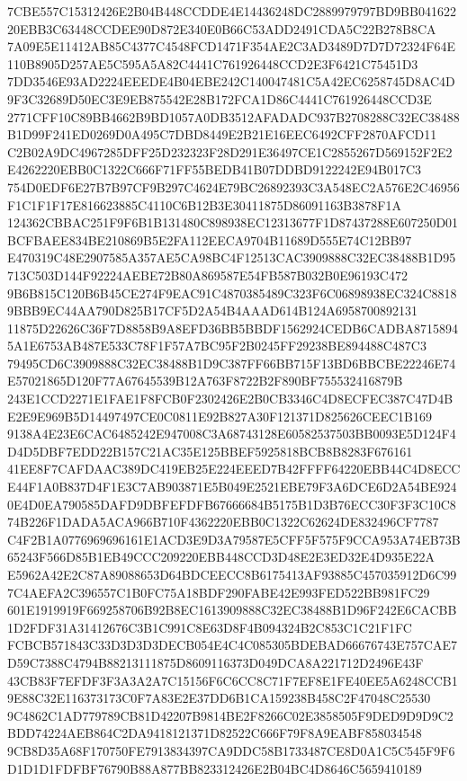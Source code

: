 \documentclass[UTF8,fontset=fandol,zihao=-4,a4paper]{ctexart}
\begin{document}
{{7CBE557C15312426E2B04B448CCDDE4E14436248DC2889979797BD9BB04162220EBB3C63448CCDEE90D872E340E0B66C53ADD2491CDA5C22B278B8CA
7A09E5E11412AB85C4377C4548FCD1471F354AE2C3AD3489D7D7D72324F64E110B8905D257AE5C595A5A82C4441C761926448CCD2E3F6421C75451D3
7DD3546E93AD2224EEEDE4B04EBE242C140047481C5A42EC6258745D8AC4D9F3C32689D50EC3E9EB875542E28B172FCA1D86C4441C761926448CCD3E
2771CFF10C89BB4662B9BD1057A0DB3512AFADADC937B2708288C32EC38488B1D99F241ED0269D0A495C7DBD8449E2B21E16EEC6492CFF2870AFCD11
C2B02A9DC4967285DFF25D232323F28D291E36497CE1C2855267D569152F2E2E4262220EBB0C1322C666F71FF55BEDB41B07DDBD9122242E94B017C3
754D0EDF6E27B7B97CF9B297C4624E79BC26892393C3A548EC2A576E2C46956F1C1F1F17E816623885C4110C6B12B3E30411875D86091163B3878F1A
124362CBBAC251F9F6B1B131480C898938EC12313677F1D87437288E607250D01BCFBAEE834BE210869B5E2FA112EECA9704B11689D555E74C12BB97
E470319C48E2907585A357AE5CA98BC4F12513CAC3909888C32EC38488B1D95713C503D144F92224AEBE72B80A869587E54FB587B032B0E96193C472
9B6B815C120B6B45CE274F9EAC91C4870385489C323F6C06898938EC324C88189BBB9EC44AA790D825B17CF5D2A54B4AAAD614B124A6958700892131
11875D22626C36F7D8858B9A8EFD36BB5BBDF1562924CEDB6CADBA87158945A1E6753AB487E533C78F1F57A7BC95F2B0245FF29238BE894488C487C3
79495CD6C3909888C32EC38488B1D9C387FF66BB715F13BD6BBCBE22246E74E57021865D120F77A67645539B12A763F8722B2F890BF755532416879B
243E1CCD2271E1FAE1F8FCB0F2302426E2B0CB3346C4D8ECFEC387C47D4BE2E9E969B5D14497497CE0C0811E92B827A30F121371D825626CEEC1B169
9138A4E23E6CAC6485242E947008C3A68743128E60582537503BB0093E5D124F4D4D5DBF7EDD22B157C21AC35E125BBEF5925818BCB8B8283F676161
41EE8F7CAFDAAC389DC419EB25E224EEED7B42FFFF64220EBB44C4D8ECCE44F1A0B837D4F1E3C7AB903871E5B049E2521EBE79F3A6DCE6D2A54BE924
0E4D0EA790585DAFD9DBFEFDFB67666684B5175B1D3B76ECC30F3F3C10C874B226F1DADA5ACA966B710F4362220EBB0C1322C62624DE832496CF7787
C4F2B1A0776969696161E1ACD3E9D3A79587E5CFF5F575F9CCA953A74EB73B65243F566D85B1EB49CCC209220EBB448CCD3D48E2E3ED32E4D935E22A
E5962A42E2C87A89088653D64BDCEECC8B6175413AF93885C457035912D6C997C4AEFA2C396557C1B0FC75A18BDF290FABE42E993FED522BB981FC29
601E1919919F669258706B92B8EC1613909888C32EC38488B1D96F242E6CACBB1D2FDF31A31412676C3B1C991C8E63D8F4B094324B2C853C1C21F1FC
FCBCB571843C33D3D3D3DECB054E4C4C085305BDEBAD66676743E757CAE7D59C7388C4794B88213111875D8609116373D049DCA8A221712D2496E43F
43CB83F7EFDF3F3A3A2A7C15156F6C6CC8C71F7EF8E1FE40EE5A6248CCB19E88C32E116373173C0F7A83E2E37DD6B1CA159238B458C2F47048C25530
9C4862C1AD779789CB81D42207B9814BE2F8266C02E3858505F9DED9D9D9C2BDD74224AEB864C2DA9418121371D82522C666F79F8A9EABF858034548
9CB8D35A68F170750FE7913834397CA9DDC58B1733487CE8D0A1C5C545F9F6D1D1D1FDFBF76790B88A877BB823312426E2B04BC4D8646C5659410189
}}
\end{document}
